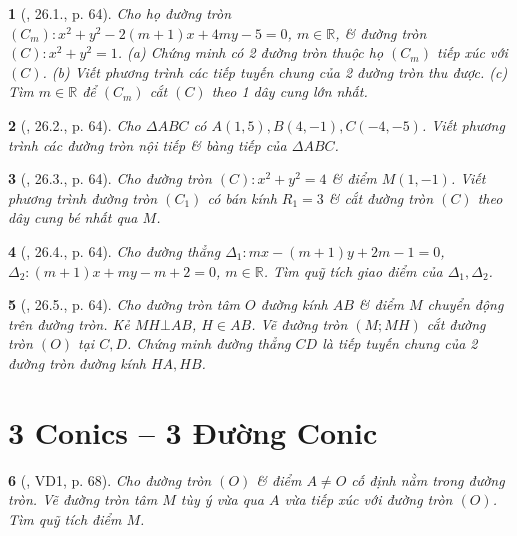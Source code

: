 \documentclass{article}
\newtheorem{baitoan}{}
\begin{document}
\begin{baitoan}[\cite{Hai_Hung_Thu_Tung_ncpt_Toan_10_tap_2}, 26.1., p. 64]
	Cho họ đường tròn $(C_m):x^2 + y^2 - 2(m + 1)x + 4my - 5 = 0$, $m\in\mathbb{R}$, \& đường tròn $(C):x^2 + y^2 = 1$. (a) Chứng minh có 2 đường tròn thuộc họ $(C_m)$ tiếp xúc với $(C)$. (b) Viết phương trình các tiếp tuyến chung của 2 đường tròn thu được. (c) Tìm $m\in\mathbb{R}$ để $(C_m)$ cắt $(C)$ theo 1 dây cung lớn nhất.
\end{baitoan}

\begin{baitoan}[\cite{Hai_Hung_Thu_Tung_ncpt_Toan_10_tap_2}, 26.2., p. 64]
	Cho $\Delta ABC$ có $A(1,5),B(4,-1),C(-4,-5)$. Viết phương trình các đường tròn nội tiếp \& bàng tiếp của $\Delta ABC$.
\end{baitoan}

\begin{baitoan}[\cite{Hai_Hung_Thu_Tung_ncpt_Toan_10_tap_2}, 26.3., p. 64]
	Cho đường tròn $(C):x^2 + y^2 = 4$ \& điểm $M(1,-1)$. Viết phương trình đường tròn $(C_1)$ có bán kính $R_1 = 3$ \& cắt đường tròn $(C)$ theo dây cung bé nhất qua $M$.
\end{baitoan}

\begin{baitoan}[\cite{Hai_Hung_Thu_Tung_ncpt_Toan_10_tap_2}, 26.4., p. 64]
	Cho đường thẳng $\Delta_1:mx - (m + 1)y + 2m - 1 = 0$, $\Delta_2:(m + 1)x + my - m + 2 = 0$, $m\in\mathbb{R}$. Tìm quỹ tích giao điểm của $\Delta_1,\Delta_2$.
\end{baitoan}

\begin{baitoan}[\cite{Hai_Hung_Thu_Tung_ncpt_Toan_10_tap_2}, 26.5., p. 64]
	Cho đường tròn tâm $O$ đường kính $AB$ \& điểm $M$ chuyển động trên đường tròn. Kẻ $MH\bot AB$, $H\in AB$. Vẽ đường tròn $(M;MH)$ cắt đường tròn $(O)$ tại $C,D$. Chứng minh đường thẳng $CD$ là tiếp tuyến chung của 2 đường tròn đường kính $HA,HB$.
\end{baitoan}


\section{3 Conics -- 3 Đường Conic}

\begin{baitoan}[\cite{Hai_Hung_Thu_Tung_ncpt_Toan_10_tap_2}, VD1, p. 68]
	Cho đường tròn $(O)$ \& điểm $A\ne O$ cố định nằm trong đường tròn. Vẽ đường tròn tâm $M$ tùy ý vừa qua $A$ vừa tiếp xúc với đường tròn $(O)$. Tìm quỹ tích điểm $M$.
\end{baitoan}
\end{document}
